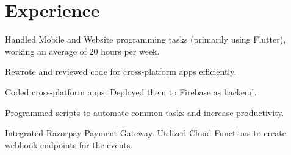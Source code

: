 \documentclass[]{deedy-resume-reversed}
\begin{document}
%
%

%
%

%
%

\begin{minipage}[t]{0.6\textwidth}


\section{Experience}
\vspace{\topsep} %
\begin{tightemize}
\item Handled Mobile and Website programming tasks (primarily using Flutter), working an average of 20 hours per week.
\item Rewrote and reviewed code for cross-platform apps efficiently.
\item Coded cross-platform apps. Deployed them to Firebase as backend.
\item Programmed scripts to automate common tasks and increase productivity.
\item Integrated Razorpay Payment Gateway. Utilized Cloud Functions to create webhook endpoints for the events.
\end{tightemize}
\sectionsep


\end{minipage}
\end{document}

